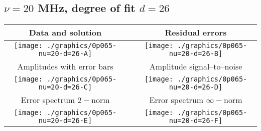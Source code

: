 

% 

\clearpage{}
\break{}

\subsection{$\nu = 20$ MHz, degree of fit $d = 26$}

\begin{table}[h]
    \begin{center}
        \begin{tabular}{ccc}
            Data and solution & \quad & Residual errors \\\hline
            \texttt{[image: ./graphics/0p065-nu=20-d=26-A]} &&
            \texttt{[image: ./graphics/0p065-nu=20-d=26-B]} \\[15pt]
            Amplitudes with error bars && Amplitude signal--to--noise \\\hline
            \texttt{[image: ./graphics/0p065-nu=20-d=26-C]} &&
            \texttt{[image: ./graphics/0p065-nu=20-d=26-D]} \\[15pt]
            Error spectrum $2-$norm && Error spectrum $\infty-$norm \\\hline
            \texttt{[image: ./graphics/0p065-nu=20-d=26-E]} &&
            \texttt{[image: ./graphics/0p065-nu=20-d=26-F]} \\[15pt]
        \end{tabular}
    \end{center}
\label{fig:elev=65, nu=20}
\end{table}



\endinput

